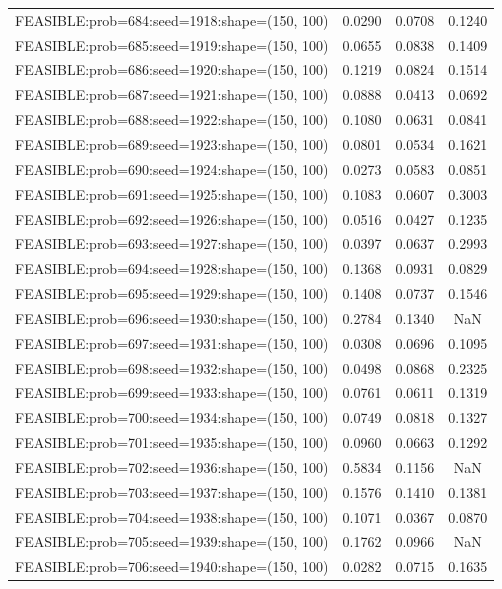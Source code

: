 \begin{longtable}{lccc}
FEASIBLE:prob=684:seed=1918:shape=(150, 100) & 0.0290 & 0.0708 & 0.1240 \\
FEASIBLE:prob=685:seed=1919:shape=(150, 100) & 0.0655 & 0.0838 & 0.1409 \\
FEASIBLE:prob=686:seed=1920:shape=(150, 100) & 0.1219 & 0.0824 & 0.1514 \\
FEASIBLE:prob=687:seed=1921:shape=(150, 100) & 0.0888 & 0.0413 & 0.0692 \\
FEASIBLE:prob=688:seed=1922:shape=(150, 100) & 0.1080 & 0.0631 & 0.0841 \\
FEASIBLE:prob=689:seed=1923:shape=(150, 100) & 0.0801 & 0.0534 & 0.1621 \\
FEASIBLE:prob=690:seed=1924:shape=(150, 100) & 0.0273 & 0.0583 & 0.0851 \\
FEASIBLE:prob=691:seed=1925:shape=(150, 100) & 0.1083 & 0.0607 & 0.3003 \\
FEASIBLE:prob=692:seed=1926:shape=(150, 100) & 0.0516 & 0.0427 & 0.1235 \\
FEASIBLE:prob=693:seed=1927:shape=(150, 100) & 0.0397 & 0.0637 & 0.2993 \\
FEASIBLE:prob=694:seed=1928:shape=(150, 100) & 0.1368 & 0.0931 & 0.0829 \\
FEASIBLE:prob=695:seed=1929:shape=(150, 100) & 0.1408 & 0.0737 & 0.1546 \\
FEASIBLE:prob=696:seed=1930:shape=(150, 100) & 0.2784 & 0.1340 &    NaN \\
FEASIBLE:prob=697:seed=1931:shape=(150, 100) & 0.0308 & 0.0696 & 0.1095 \\
FEASIBLE:prob=698:seed=1932:shape=(150, 100) & 0.0498 & 0.0868 & 0.2325 \\
FEASIBLE:prob=699:seed=1933:shape=(150, 100) & 0.0761 & 0.0611 & 0.1319 \\
FEASIBLE:prob=700:seed=1934:shape=(150, 100) & 0.0749 & 0.0818 & 0.1327 \\
FEASIBLE:prob=701:seed=1935:shape=(150, 100) & 0.0960 & 0.0663 & 0.1292 \\
FEASIBLE:prob=702:seed=1936:shape=(150, 100) & 0.5834 & 0.1156 &    NaN \\
FEASIBLE:prob=703:seed=1937:shape=(150, 100) & 0.1576 & 0.1410 & 0.1381 \\
FEASIBLE:prob=704:seed=1938:shape=(150, 100) & 0.1071 & 0.0367 & 0.0870 \\
FEASIBLE:prob=705:seed=1939:shape=(150, 100) & 0.1762 & 0.0966 &    NaN \\
FEASIBLE:prob=706:seed=1940:shape=(150, 100) & 0.0282 & 0.0715 & 0.1635 \\

\end{longtable}
